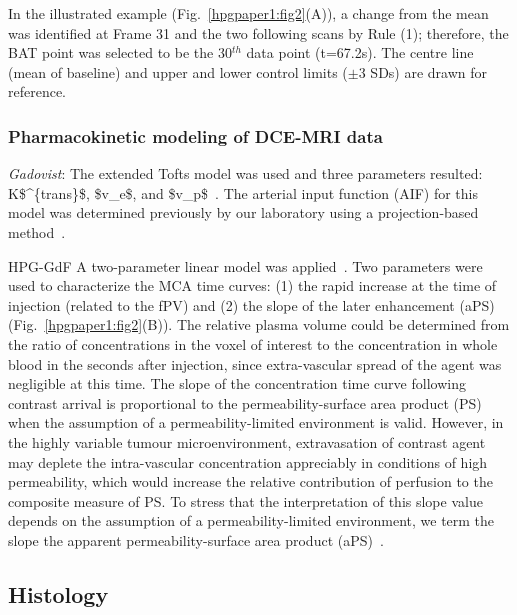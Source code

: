 In the illustrated example (Fig.~\ref{hpgpaper1:fig2}(A)), a change from the mean was identified at Frame 31 and the two following scans by Rule (1); therefore, the \acs{BAT} point was selected to be the 30$^{th}$ data point (t=67.2s).
The centre line (mean of baseline) and upper and lower control limits ($\pm$3 SDs) are drawn for reference.

\subsubsection{Pharmacokinetic modeling of DCE-MRI data}

\textit{Gadovist}: The extended Tofts model was used and three parameters resulted: \acs{K$^{trans}$}, \acs{$v_e$}, and \acs{$v_p$}~\cite{Sourbron:2011ce}.
The arterial input function (AIF) for this model was determined previously by our laboratory using a projection-based method~\cite{Moroz:2013ee}.

\acs{HPG-GdF} A two-parameter linear model was applied~\cite{Pathak:2005gu}.
Two parameters were used to characterize the \acs{MCA} time curves: (1) the rapid increase at the time of injection (related to the \acs{fPV}) and (2) the slope of the later enhancement (aPS) (Fig.~\ref{hpgpaper1:fig2}(B)).
The relative plasma volume could be determined from the ratio of concentrations in the voxel of interest to the concentration in whole blood in the seconds after injection, since extra-vascular spread of the agent was negligible at this time.
The slope of the concentration time curve following contrast arrival is proportional to the permeability-surface area product (PS) when the assumption of a permeability-limited environment is valid.
However, in the highly variable tumour microenvironment, extravasation of contrast agent may deplete the intra-vascular concentration appreciably in conditions of high permeability, which would increase the relative contribution of perfusion to the composite measure of PS.
To stress that the interpretation of this slope value depends on the assumption of a permeability-limited environment, we term the slope the apparent permeability-surface area product (\acs{aPS})~\cite{DaldrupLink:2004gy,Dafni:2002kb}.

\subsection{Histology}

